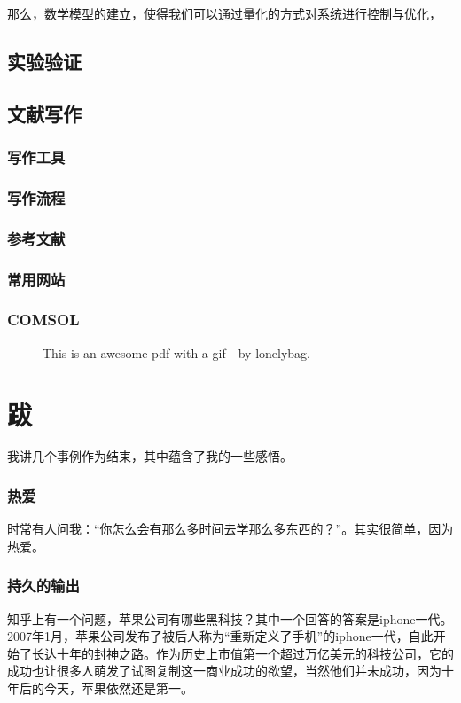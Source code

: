 \documentclass[UTF8]{ctexbook}
\begin{document}
那么，数学模型的建立，使得我们可以通过量化的方式对系统进行控制与优化，

\section{实验验证}

\section{文献写作}
\subsection{写作工具}
\subsection{写作流程}
\subsection{参考文献}

\subsection{常用网站}

\subsection{COMSOL}

\begin{figure}[!htb]
	\centering
	\vspace{-0.3cm}
	\caption{This is an awesome pdf with a gif - by lonelybag.}\label{fig:39}
\end{figure}

\chapter*{跋}
我讲几个事例作为结束，其中蕴含了我的一些感悟。

\subsection*{热爱}
时常有人问我：“你怎么会有那么多时间去学那么多东西的？”。其实很简单，因为热爱。

\subsection*{持久的输出}
知乎上有一个问题，苹果公司有哪些黑科技？其中一个回答的答案是iphone一代。2007年1月，苹果公司发布了被后人称为“重新定义了手机”的iphone一代，自此开始了长达十年的封神之路。作为历史上市值第一个超过万亿美元的科技公司，它的成功也让很多人萌发了试图复制这一商业成功的欲望，当然他们并未成功，因为十年后的今天，苹果依然还是第一。
\end{document}
